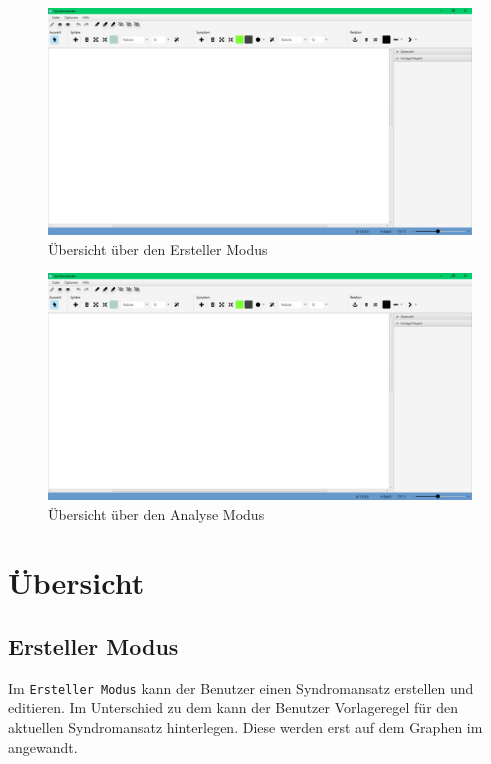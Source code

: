 \documentclass[enabledeprecatedfontcommands,fontsize=11pt,paper=a4,twoside]{scrartcl}
\begin{document}
\begin{landscape}
	\begin{figure}
		\centering
		\includegraphics[width=22cm]{overview.png}
		\caption{Übersicht über den Ersteller Modus}
		\label{fig:label}
	\end{figure}
\end{landscape}
\begin{landscape}
	\begin{figure}
		\centering
		\includegraphics[width=22cm]{overview.png}
		\caption{Übersicht über den Analyse Modus}
		\label{fig:label}
	\end{figure}
\end{landscape}




\newpage	
\section{Übersicht} \label{sec:uebersicht}
\subsection{Ersteller Modus}
Im \texttt{Ersteller Modus} kann der Benutzer einen Syndromansatz erstellen und editieren. Im Unterschied zu dem  kann der Benutzer Vorlageregel für den aktuellen Syndromansatz hinterlegen. Diese werden erst auf dem Graphen im  angewandt. 
\end{document}
